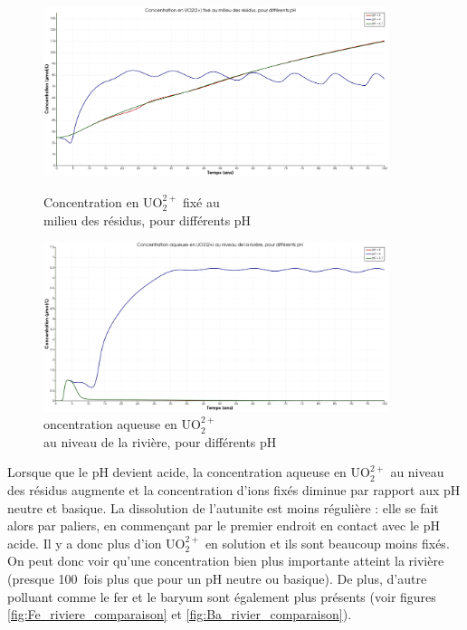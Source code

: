 \documentclass{article}
\begin{document}
\begin{figure}[H]
    \centering
    \begin{minipage}{0.5\textwidth}
        \centering
        \includegraphics[width=0.9\textwidth]{III_B_2_11.png} 
        \caption{Concentration en UO$_2^{2+}$ fixé au \\milieu des résidus, pour différents pH}
        \label{fig:UO2_fixe_residus_comparaison}
    \end{minipage}\hfill
    \begin{minipage}{0.5\textwidth}
        \centering
        \includegraphics[width=0.9\textwidth]{III_B_2_12.png} 
        \caption{oncentration aqueuse en UO$_2^{2+}$ \\au niveau de la rivière, pour différents pH}
        \label{fig:UO2_riviere_comparaison}
    \end{minipage}
\end{figure}


Lorsque que le pH devient acide, la concentration aqueuse en UO$_2^{2+}$ au niveau des résidus augmente et la concentration d’ions fixés diminue par rapport aux pH neutre et basique. La dissolution de l’autunite est moins régulière : elle se fait alors par paliers, en commençant par le premier endroit en contact avec le pH acide. Il y a donc plus d’ion UO$_2^{2+}$ en solution et ils sont beaucoup moins fixés. On peut donc voir qu’une concentration bien plus importante atteint la rivière (presque 100~fois plus que pour un pH neutre ou basique). De plus, d’autre polluant comme le fer et le baryum sont également plus présents (voir figures \ref{fig:Fe_riviere_comparaison} et \ref{fig:Ba_rivier_comparaison}).
\end{document}
